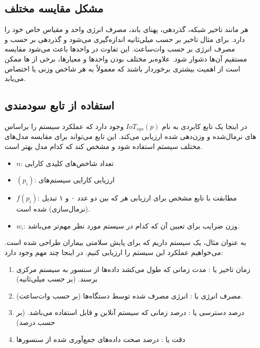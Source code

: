 \subsection{مشکل مقایسه  مختلف}

هر  مانند تاخیر شبکه، گذردهی، پهنای باند، مصرف انرژی واحد و مقیاس خاص
خود را دارد. برای مثال تاخیر بر حسب میلی‌ثانیه  اندازه‌گیری می‌شود و
گذردهی بر حسب  و مصرف انرژی بر حسب وات‌ساعت. این تفاوت در واحد‌ها باعث
می‌شود مقایسه مستقیم آن‌ها دشوار شود. علاوه‌بر مختلف بودن واحد‌ها و معیار‌ها،
برخی از ها ممکن است از اهمیت بیشتری برخوردار باشند که معمولاً به هر شاخص
وزنی یا  اختصاص می‌یابد.

\subsection{استفاده از تابع سودمندی }

در اینجا یک تابع کابردی به نام $IoT_{sys}(p)$ وجود دارد که عملکرد سیستم 
را براساس های نرمال‌شده و وزن‌دهی شده ارزیابی می‌کند. این تابع می‌تواند
برای مقایسه مدل‌های مختلف سیستم  استفاده شود و مشخص کند که کدام مدل بهتر
است.

\label{compareIoTSystems}

\begin{itemize}
    \item $n$: تعداد شاخص‌های کلیدی کارایی
    \item $(p_i)$: ارزیابی کارایی سیستم‌های 
    \item $f(p_i)$: مطابقت با تابع  مشخص برای ارزیابی هر  که
    بین دو عدد ۰ و ۱ تبدیل (نرمال‌سازی) شده است.
    \item $w_i$: وزن ضرایب برای تعیین آن که کدام  در سیستم  مورد
    نظر مهم‌تر می‌باشد.
\end{itemize}

به عنوان مثال، یک سیستم  داریم که برای پایش سلامتی بیماران طراحی شده
است. می‌خواهیم عملکرد این سیستم را ارزیابی کنیم. در اینجا چند  مهم وجود
دارد:

\begin{enumerate}
    \item زمان تاخیر یا : مدت زمانی که طول می‌کشد داده‌ها از سنسور
    به سیستم مرکزی برسند. (بر حسب میلی‌ثانیه)
    \item مصرف انرژی یا : انرژی مصرف شده توسط دستگاه‌ها
    (بر حسب وات‌ساعت).
    \item درصد دسترسی یا : درصد زمانی که سیستم آنلاین و قابل
    استفاده می‌باشد. (بر حسب درصد)
    \item دقت یا : درصد صحت داده‌های جمع‌آوری شده از سنسور‌ها
\end{enumerate}

